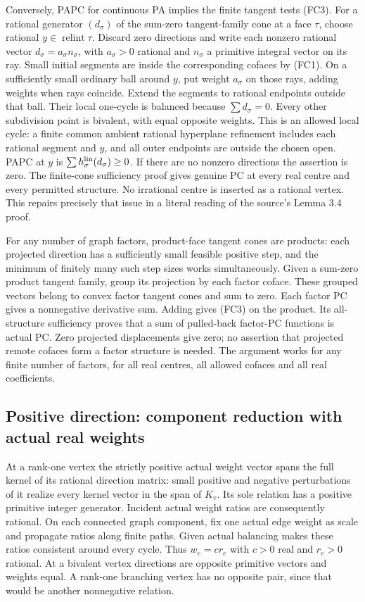 \documentclass[
  11pt,
]{article}
\begin{document}
Conversely, PAPC for continuous PA implies the finite tangent tests
(FC3). For a rational generator \((d_\sigma)\) of the sum-zero
tangent-family cone at a face \(\tau\), choose rational
\(y\in\operatorname{relint}\tau\). Discard zero directions and write
each nonzero rational vector \(d_\sigma=a_\sigma n_\sigma\), with
\(a_\sigma>0\) rational and \(n_\sigma\) a primitive integral vector on
its ray. Small initial segments are inside the corresponding cofaces by
(FC1). On a sufficiently small ordinary ball around \(y\), put weight
\(a_\sigma\) on those rays, adding weights when rays coincide. Extend
the segments to rational endpoints outside that ball. Their local
one-cycle is balanced because \(\sum d_\sigma=0\). Every other
subdivision point is bivalent, with equal opposite weights. This is an
allowed local cycle: a finite common ambient rational hyperplane
refinement includes each rational segment and \(y\), and all outer
endpoints are outside the chosen open. PAPC at \(y\) is
\(\sum h_\sigma^{\rm lin}(d_\sigma)\geq0\). If there are no nonzero
directions the assertion is zero. The finite-cone sufficiency proof
gives genuine PC at every real centre and every permitted structure. No
irrational centre is inserted as a rational vertex. This repairs
precisely that issue in a literal reading of the source's Lemma 3.4
proof.

For any number of graph factors, product-face tangent cones are
products: each projected direction has a sufficiently small feasible
positive step, and the minimum of finitely many such step sizes works
simultaneously. Given a sum-zero product tangent family, group its
projection by each factor coface. These grouped vectors belong to convex
factor tangent cones and sum to zero. Each factor PC gives a nonnegative
derivative sum. Adding gives (FC3) on the product. Its all-structure
sufficiency proves that a sum of pulled-back factor-PC functions is
actual PC. Zero projected displacements give zero; no assertion that
projected remote cofaces form a factor structure is needed. The argument
works for any finite number of factors, for all real centres, all
allowed cofaces and all real coefficients.

\subsection{Positive direction: component reduction with actual real
weights}\label{positive-direction-component-reduction-with-actual-real-weights}

At a rank-one vertex the strictly positive actual weight vector spans
the full kernel of its rational direction matrix: small positive and
negative perturbations of it realize every kernel vector in the span of
\(K_v\). Its sole relation has a positive primitive integer generator.
Incident actual weight ratios are consequently rational. On each
connected graph component, fix one actual edge weight as scale and
propagate ratios along finite paths. Given actual balancing makes these
ratios consistent around every cycle. Thus \(w_e=c r_e\) with \(c>0\)
real and \(r_e>0\) rational. At a bivalent vertex directions are
opposite primitive vectors and weights equal. A rank-one branching
vertex has no opposite pair, since that would be another nonnegative
relation.
\end{document}
